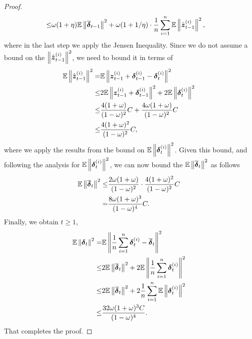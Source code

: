 \begin{proof}
\begin{align*}
    \leq & \omega(1+\eta)\mathbb{E}\left\|  \overline{\boldsymbol{\delta}}_{t-1}\right\|^2 + \omega(1+1/\eta)\cdot\frac{1}{n}\sum_{i=1}^{n}\mathbb{E}\left\| \hat{\boldsymbol{z}}_{t-1}^{(i)}\right\|^2,
\end{align*}
where in the last step we apply the Jensen Inequality. Since we do not assume a bound on the $\left\| \hat{\boldsymbol{z}}_{t-1}^{(i)}\right\|^2$, we need to bound it in terms of
\begin{align*}
\mathbb{E}\left\| \hat{\boldsymbol{z}}_{t-1}^{(i)}\right\|^2 = & \mathbb{E}\left\| \boldsymbol{z}_{t-1}^{(i)} + \boldsymbol{\delta}_{t-1}^{(i)} - \boldsymbol{\delta}_t^{(i)} \right\|^2 \\
    \leq & 2\mathbb{E}\left\| \boldsymbol{z}_{t-1}^{(i)} + \boldsymbol{\delta}_{t-1}^{(i)} \right\|^2 + 2\mathbb{E}\left\|  \boldsymbol{\delta}_t^{(i)} \right\|^2 \\
\leq & \frac{4(1+\omega)}{(1-\omega)^2}C + \frac{4\omega(1+\omega)}{(1-\omega)^2}C \\
    \leq & \frac{4(1+\omega)^2}{(1-\omega)^2}C,
\end{align*}
where we apply the results from the bound on $\mathbb{E}\left\|  \boldsymbol{\delta}_t^{(i)} \right\|^2$. Given this bound, and following the analysis for $\mathbb{E}\left\|  \boldsymbol{\delta}_t^{(i)} \right\|^2$, we can now bound the $\mathbb{E}\left\|  \overline{\boldsymbol{\delta}}_t \right\|^2$ as follows
\begin{align*}
    \mathbb{E}\left\|  \overline{\boldsymbol{\delta}}_t \right\|^2 \leq & \frac{2\omega(1+\omega)}{(1-\omega)^2} \cdot\frac{4(1+\omega)^2}{(1-\omega)^2}C \\
    = & \frac{8\omega(1+\omega)^3}{(1-\omega)^4}C.
\end{align*}
Finally, we obtain $t\geq 1$,
\begin{align*}
\mathbb{E}\left\| \boldsymbol{\delta}_{t} \right\|^2 = & \mathbb{E}\left\| \frac{1}{n}\sum_{i=1}^{n}\boldsymbol{\delta}^{(i)}_{t} - \overline{\boldsymbol{\delta}}_{t} \right\|^2 \\
    \leq & 2\mathbb{E}\left\| \overline{\boldsymbol{\delta}}_{t} \right\|^2 + 2\mathbb{E}\left\| \frac{1}{n}\sum_{i=1}^{n}\boldsymbol{\delta}^{(i)}_{t} \right\|^2 \\
\leq & 2\mathbb{E}\left\| \overline{\boldsymbol{\delta}}_{t} \right\|^2 + 2\frac{1}{n}\sum_{i=1}^{n}\mathbb{E}\left\| \boldsymbol{\delta}^{(i)}_{t} \right\|^2 \\
    \leq & \frac{32\omega(1+\omega)^3C}{(1-\omega)^4}.
\end{align*}
That completes the proof.
\end{proof}

